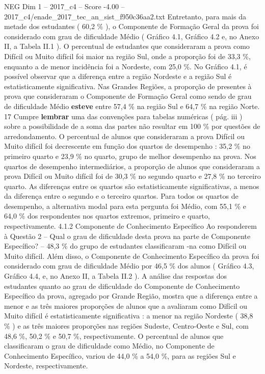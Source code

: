 \begin{textsample}{NEG Dim 1 – 2017\_c4 – Score -4.00 – 2017\_c4/enade\_2017\_tec\_an\_sist\_f950c36aa2.txt}
Entretanto, para mais da metade dos estudantes ( 60,2 \% ), o Componente de Formação Geral da prova foi considerado com grau de dificuldade Médio ( Gráfico 4.1, Gráfico 4.2 e, no Anexo II, a Tabela II.1 ).
O percentual de estudantes que consideraram a prova como Difícil ou Muito difícil foi maior na região Sul, onde a proporção foi de 33,3 \%, enquanto a de menor incidência foi a Nordeste, com 25,0 \%.
No Gráfico 4.1, é possível observar que a diferença entre a região Nordeste e a região Sul é estatisticamente significativa.
Nas Grandes Regiões, a proporção de presentes à prova que consideraram o Componente de Formação Geral como sendo de grau de dificuldade Médio \textbf{esteve} entre 57,4 \% na região Sul e 64,7 \% na região Norte. 17 Cumpre \textbf{lembrar} uma das convenções para tabelas numéricas ( pág. iii ) sobre a possibilidade de a soma das partes não resultar em 100 \% por questões de arredondamento.
O percentual de alunos que consideraram a prova Difícil ou Muito difícil foi decrescente em função dos quartos de desempenho : 35,2 \% no primeiro quarto e 23,9 \% no quarto, grupo de melhor desempenho na prova.
Nos quartos de desempenho intermediários, a proporção de alunos que consideraram a prova Difícil ou Muito difícil foi de 30,3 \% no segundo quarto e 27,8 \% no terceiro quarto.
As diferenças entre os quartos são estatisticamente significativas, a menos da diferença entre o segundo e o terceiro quartos.
Para todos os quartos de desempenho, a alternativa modal para esta pergunta foi Médio, com 55,1 \% e 64,0 \% dos respondentes nos quartos extremos, primeiro e quarto, respectivamente. 4.1.2 Componente de Conhecimento Específico Ao responderem à Questão 2 – Qual o grau de dificuldade desta prova na parte de Componente Específico? – 48,3 \% do grupo de estudantes classificaram -na como Difícil ou Muito difícil.
Além disso, o Componente de Conhecimento Específico da prova foi considerado com grau de dificuldade Médio por 46,5 \% dos alunos ( Gráfico 4.3, Gráfico 4.4, e, no Anexo II, a Tabela II.2 ).
A análise das respostas dos estudantes quanto ao grau de dificuldade do Componente de Conhecimento Específico da prova, agregado por Grande Região, mostra que a diferença entre a menor e as três maiores proporções de alunos que a avaliaram como Difícil ou Muito difícil é estatisticamente significativa : a menor na região Nordeste ( 38,8 \% ) e as três maiores proporções nas regiões Sudeste, Centro-Oeste e Sul, com 48,6 \%, 50,2 \% e 50,7 \%, respectivamente.
O percentual de alunos que classificaram o grau de dificuldade como Médio, no Componente de Conhecimento Específico, variou de 44,0 \% a 54,0 \%, para as regiões Sul e Nordeste, respectivamente.

\end{textsample}
